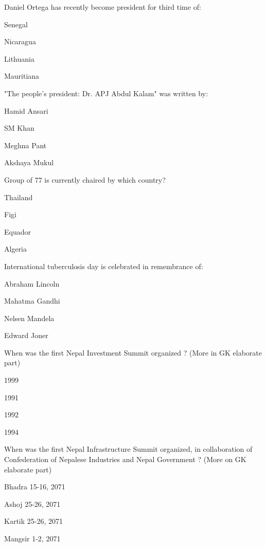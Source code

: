 \begin{questions}
\question Daniel Ortega has recently become president for third time of:
  \begin{items}
  \item Senegal
  \item Nicaragua
  \item Lithuania
  \item Mauritiana
  \end{items}

\question "The people's president: Dr. APJ Abdul Kalam" was written by:
  \begin{items}
  \item Hamid Ansari
  \item SM Khan
  \item Meghna Pant
  \item Akshaya Mukul
  \end{items}

\question Group of 77 is currently chaired by which country?
  \begin{items}
  \item Thailand
  \item Figi
  \item Equador
  \item Algeria
  \end{items}

\question International tuberculosis day is celebrated in remembrance of:
  \begin{items}
  \item Abraham Lincoln
  \item Mahatma Gandhi
  \item Nelsen Mandela
  \item Edward Joner
  \end{items}

\question When was the first Nepal Investment Summit organized ? (More in GK elaborate part)

\begin{items}
\item 1999
\item 1991
\item* 1992
\item 1994
\end{items}

\question When was the first Nepal Infrastructure Summit organized, in collaboration of Confederation of Nepalese Industries and Nepal Government  ? (More on GK elaborate part)

\begin{items}
\item Bhadra 15-16, 2071
\item Ashoj 25-26, 2071
\item* Kartik 25-26, 2071
\item Mangsir 1-2, 2071
\end{items}

\end{questions}





